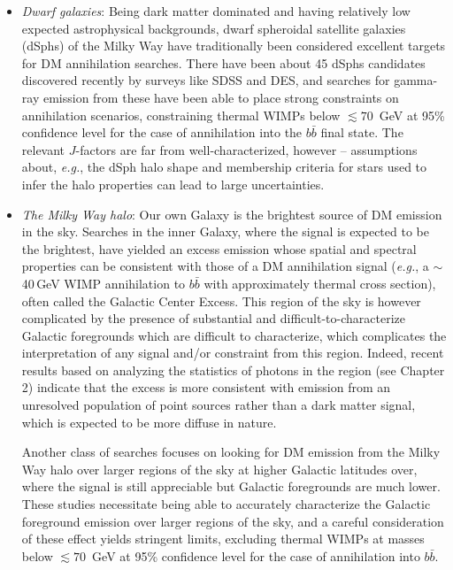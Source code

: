 \begin{itemize}
\item \emph{Dwarf galaxies}: Being dark matter dominated and having relatively low expected astrophysical backgrounds, dwarf spheroidal satellite galaxies (dSphs) of the Milky Way have traditionally been considered excellent targets for DM annihilation searches. There have been about 45 dSphs candidates discovered recently by surveys like SDSS and DES, and searches for gamma-ray emission from these have been able to place strong constraints on annihilation scenarios, constraining thermal WIMPs below $\lesssim 70$~GeV at 95\% confidence level for the case of annihilation into  the $b\bar b$ final state. The relevant $J$-factors are far from well-characterized, however -- assumptions about, \emph{e.g.}, the dSph halo shape and membership criteria for stars used to infer the halo properties can lead to large uncertainties.
\item \emph{The Milky Way halo}: Our own Galaxy is the brightest source of DM emission in the sky. Searches in the inner Galaxy, where the signal is expected to be the brightest, have yielded an excess emission whose spatial and spectral properties can be consistent with those of a DM annihilation signal (\emph{e.g.}, a $\sim$40\,GeV WIMP annihilation to $b\bar b$ with approximately thermal cross section), often called the Galactic Center Excess. This region of the sky is however complicated by the presence of substantial and difficult-to-characterize Galactic foregrounds which are difficult to characterize, which complicates the interpretation of any signal and/or constraint from this region. Indeed, recent results based on analyzing the statistics of photons in the region (see Chapter 2) indicate that the excess is more consistent with emission from an unresolved population of point sources rather than a dark matter signal, which is expected to be more diffuse in nature.

Another class of searches focuses on looking for DM emission from the Milky Way halo over larger regions of the sky at higher Galactic latitudes over, where the signal is still appreciable but Galactic foregrounds are much lower. These studies necessitate being able to accurately characterize the Galactic foreground emission over larger regions of the sky, and a careful consideration of these effect yields stringent limits, excluding thermal WIMPs at masses below $\lesssim 70$~GeV at 95\% confidence level for the case of annihilation into $b\bar b$.


\end{itemize}
